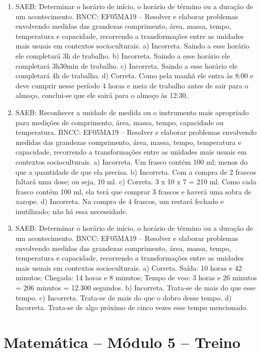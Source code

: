 \begin{enumerate}
\item
SAEB: Determinar o horário de início, o horário de término ou a duração de um acontecimento.
BNCC: EF05MA19 – Resolver e elaborar problemas envolvendo medidas das grandezas comprimento,
área, massa, tempo, temperatura e capacidade, recorrendo a transformações entre as unidades
mais usuais em contextos socioculturais.
a) Incorreta. Saindo a esse horário ele completará 3h de trabalho.
b) Incorreta. Saindo a esse horário ele completará 3h30min de trabalho.
c) Incorreta. Saindo a esse horário ele completará 4h de trabalho.
d) Correta. Como pela manhã ele entra às 8:00 e deve cumprir nesse período 4 horas e
meia de trabalho antes de sair para o almoço, conclui-se que ele sairá
para o almoço às 12:30.

\item
SAEB: Reconhecer a unidade de medida ou o instrumento mais apropriado para medições de comprimento, área, massa, tempo, capacidade ou temperatura.
BNCC: EF05MA19 – Resolver e elaborar problemas envolvendo medidas das grandezas comprimento,
área, massa, tempo, temperatura e capacidade, recorrendo a transformações entre as unidades
mais usuais em contextos socioculturais.
a) Incorreta. Um frasco contém 100 ml; menos do que a quantidade de que ela precisa.
b) Incorreta. Com a compra de 2 frascos faltará uma dose; ou seja, 10 ml.
c) Correta. 
3 x 10 x 7 = 210 ml. Como cada frasco contém 100 ml, ela terá que
comprar 3 frascos e haverá uma sobra de xarope.
d) Incorreta. Na compra de 4 frascos, um restará fechado e inutilizado; não há essa necessidade.

\item
SAEB: Determinar o horário de início, o horário de término ou a duração de um acontecimento.
BNCC: EF05MA19 – Resolver e elaborar problemas envolvendo medidas das grandezas comprimento,
área, massa, tempo, temperatura e capacidade, recorrendo a transformações entre as unidades
mais usuais em contextos socioculturais.
a) Correta. 
Saída: 10 horas e 42 minutos;
Chegada: 14 horas e 8 minutos;
Tempo de voo: 3 horas e 26 minutos = 206 minutos = 12.300 segundos.
b) Incorreta. Trata-se de mais do que esse tempo.
c) Incorreta. Trata-se de mais do que o dobro desse tempo.
d) Incorreta. Trata-se de algo próximo de cinco vezes esse tempo mencionado.
\end{enumerate}

\section*{Matemática -- Módulo 5 -- Treino}

